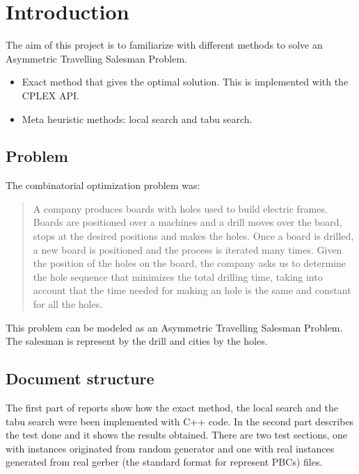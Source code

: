 \section{Introduction}
	The aim of this project is to familiarize with different methods to solve an Asymmetric Travelling Salesman Problem.
	\begin{itemize}
		\item Exact method that gives the optimal solution. This is implemented with the CPLEX API.
		\item Meta heuristic methods: local search and tabu search.
	\end{itemize}

	\subsection{Problem}
		The combinatorial optimization problem was:
		\begin{quote}
				A company produces boards with holes used to build electric frames.  Boards are positioned over a machines and a drill moves over the board, stops at the desired positions and makes the holes.  Once a board is drilled, a new board is positioned and the process is iterated many times.  Given the position of the holes on the board, the company asks us to determine the hole sequence that minimizes the total drilling time, taking into account that the time needed for making an hole is the same and constant for all the holes.
		\end{quote}
	
		This problem can be modeled as an Asymmetric Travelling Salesman Problem. The salesman is represent by the drill and cities by the holes.
	
	\subsection{Document structure}
		The first part of reports show how the exact method, the local search and the tabu search were been implemented with C++ code. In the second part describes the test done and it shows the results obtained. There are two test sections, one with instances originated from random generator and one with real instances generated from real gerber (the standard format for represent PBCs) files.